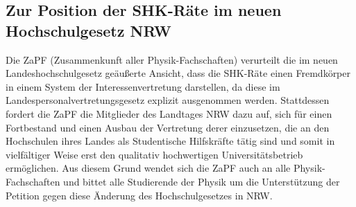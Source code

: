 
\subsection*{Zur Position der SHK-Räte im neuen Hochschulgesetz NRW}
Die ZaPF (Zusammenkunft aller Physik-Fachschaften) verurteilt die im neuen Landeshochschulgesetz
geäußerte Ansicht, dass die SHK-Räte einen Fremdkörper in einem System der Interessenvertretung darstellen, da diese im Landespersonalvertretungsgesetz explizit ausgenommen werden. Stattdessen fordert die ZaPF  die Mitglieder des Landtages
NRW dazu auf, sich für einen Fortbestand und einen Ausbau der Vertretung derer einzusetzen, die an den Hochschulen ihres
Landes als Studentische Hilfskräfte tätig sind und somit in vielfältiger Weise erst den qualitativ hochwertigen
Universitätsbetrieb ermöglichen. Aus diesem Grund wendet sich die ZaPF auch an alle Physik-Fachschaften und bittet alle
Studierende der Physik um die Unterstützung der Petition gegen diese Änderung des Hochschulgesetzes in NRW.
